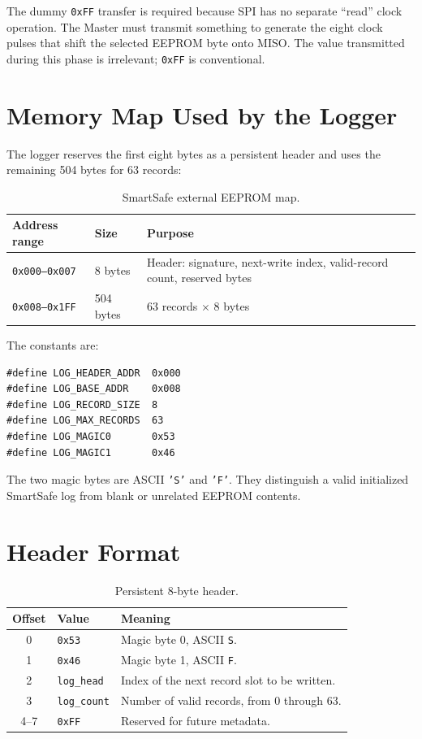 \documentclass[11pt,a4paper]{article}
\begin{document}
The dummy \texttt{0xFF} transfer is required because SPI has no separate ``read'' clock operation. The Master must transmit something to generate the eight clock pulses that shift the selected EEPROM byte onto MISO. The value transmitted during this phase is irrelevant; \texttt{0xFF} is conventional.

\section{Memory Map Used by the Logger}
The logger reserves the first eight bytes as a persistent header and uses the remaining 504 bytes for 63 records:

\begin{table}[H]
\centering
\caption{SmartSafe external EEPROM map.}
\begin{tabular}{lll}
\toprule
Address range & Size & Purpose \\
\midrule
\texttt{0x000--0x007} & 8 bytes & Header: signature, next-write index, valid-record count, reserved bytes \\
\texttt{0x008--0x1FF} & 504 bytes & 63 records $\times$ 8 bytes \\
\bottomrule
\end{tabular}
\end{table}

The constants are:
\begin{lstlisting}[style=cstyle]
#define LOG_HEADER_ADDR  0x000
#define LOG_BASE_ADDR    0x008
#define LOG_RECORD_SIZE  8
#define LOG_MAX_RECORDS  63
#define LOG_MAGIC0       0x53
#define LOG_MAGIC1       0x46
\end{lstlisting}

The two magic bytes are ASCII \texttt{'S'} and \texttt{'F'}. They distinguish a valid initialized SmartSafe log from blank or unrelated EEPROM contents.

\section{Header Format}

\begin{table}[H]
\centering
\caption{Persistent 8-byte header.}
\begin{tabular}{clp{}}
\toprule
Offset & Value & Meaning \\
\midrule
0 & \texttt{0x53} & Magic byte 0, ASCII \texttt{S}. \\
1 & \texttt{0x46} & Magic byte 1, ASCII \texttt{F}. \\
2 & \texttt{log\_head} & Index of the next record slot to be written. \\
3 & \texttt{log\_count} & Number of valid records, from 0 through 63. \\
4--7 & \texttt{0xFF} & Reserved for future metadata. \\
\bottomrule
\end{tabular}
\end{table}
\end{document}

